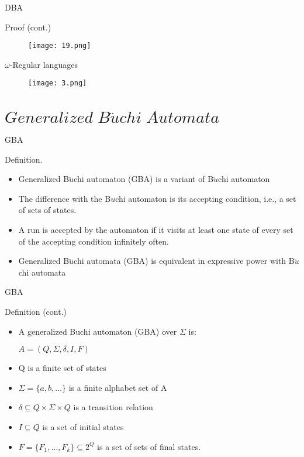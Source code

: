 \documentclass[17pt, t, lualatex]{beamer}
\begin{document}
\begin{frame}{DBA}
\begin{block}{Proof (cont.)}
    \begin{figure}
        \centering
        \texttt{[image: 19.png]}
    \end{figure}
\end{block}
\end{frame}

\begin{frame}{$\omega$-Regular languages}
\begin{figure}
    \centering
    \texttt{[image: 3.png]}
\end{figure}
\end{frame}


\section{$Generalized\; B\ddot{u}chi\; Automata$}

\insertsectionpage

\begin{frame}{GBA}
\begin{block}{Definition.}
\begin{itemize}
    \item Generalized B$\ddot{u}$chi automaton (GBA) is a variant of B$\ddot{u}$chi automaton
    \item The difference with the B$\ddot{u}$chi automaton is its accepting
    condition, i.e., a set of sets of states.
    \item A run is accepted by the automaton if it visits at least one state of
    every set of the accepting condition infinitely often.
    \item  Generalized B$\ddot{u}$chi automata (GBA) is equivalent in expressive power with B$\ddot{u}$chi automata

\end{itemize}
\end{block}
\end{frame}

\begin{frame}{GBA}
\begin{block}{Definition (cont.)}
\begin{itemize}
    \item 
    A generalized Buchi automaton (GBA) over $\Sigma$ is:
    \begin{center}
        $A = (Q, \Sigma, \delta, I, F)$
    \end{center}
    \item Q is a finite set of states
    \item $\Sigma = \{a, b, \ldots\}$ is a finite alphabet set of A
    \item $\delta \subseteq Q \times \Sigma \times Q$ is a transition relation
    \item $I \subseteq Q$ is a set of initial states
    \item $F = \{F_1,\ldots,F_k\} \subseteq 2^Q$ is a set of sets of final states.
     
\end{itemize}
\end{block}
\end{frame}
\end{document}
